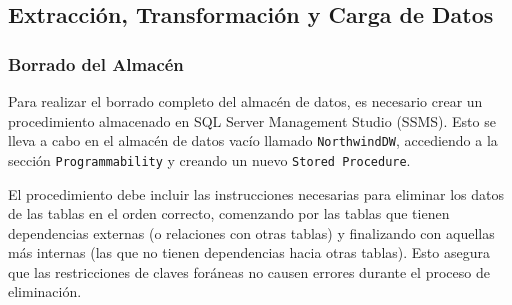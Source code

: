 \documentclass{article}
\begin{document}
	
	\subsection{Extracción, Transformación y Carga de Datos}
	
	\subsubsection{Borrado del Almacén}
	
	Para realizar el borrado completo del almacén de datos, es necesario crear un procedimiento almacenado en SQL Server Management Studio (SSMS). Esto se lleva a cabo en el almacén de datos vacío llamado \texttt{NorthwindDW}, accediendo a la sección \texttt{Programmability} y creando un nuevo \texttt{Stored Procedure}. 
	
	El procedimiento debe incluir las instrucciones necesarias para eliminar los datos de las tablas en el orden correcto, comenzando por las tablas que tienen dependencias externas (o relaciones con otras tablas) y finalizando con aquellas más internas (las que no tienen dependencias hacia otras tablas). Esto asegura que las restricciones de claves foráneas no causen errores durante el proceso de eliminación.
	
\end{document}
